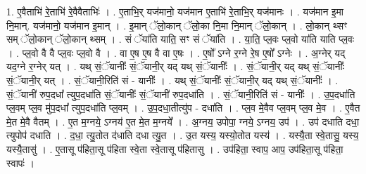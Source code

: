 \documentclass[17pt]{extarticle}
\begin{document}
1. ए॒वैताभि॑ रे॒ताभि॑ रे॒वैवैताभिः॑ । . ए॒ताभि॒र् यज॑मानो॒ यज॑मान ए॒ताभि॑ रे॒ताभि॒र् यज॑मानः । . यज॑मान इ॒मा नि॒मान्. यज॑मानो॒ यज॑मान इ॒मान् । . इ॒मान् ॅलो॒कान् ॅलो॒का नि॒मा नि॒मान् ॅलो॒कान् । . लो॒कान् थ्सꣳ सम् ॅलो॒कान् ॅलो॒कान् थ्सम् । . सं ॅया॑ति याति॒ सꣳ सं ॅया॑ति । . या॒ति॒ प्ल॒वः प्ल॒वो या॑ति याति प्ल॒वः । . प्ल॒वो वै वै प्ल॒वः प्ल॒वो वै । . वा ए॒ष ए॒ष वै वा ए॒षः । . ए॒षो᳚ ऽग्ने र॒ग्ने रे॒ष ए॒षो᳚ ऽग्नेः । . अ॒ग्नेर् यद् यद॒ग्ने र॒ग्नेर् यत् । . यथ् सं॒ॅयानीः᳚ सं॒ॅयानी॒र् यद् यथ् सं॒ॅयानीः᳚ । . सं॒ॅयानी॒र् यद् यथ् सं॒ॅयानीः᳚ सं॒ॅयानी॒र् यत् । . सं॒ॅयानी॒रिति॑ सं - यानीः᳚ । . यथ् सं॒ॅयानीः᳚ सं॒ॅयानी॒र् यद् यथ् सं॒ॅयानीः᳚ । . सं॒ॅयानी॑ रुप॒दधा᳚ त्युप॒दधा॑ति सं॒ॅयानीः᳚ सं॒ॅयानी॑ रुप॒दधा॑ति । . सं॒ॅयानी॒रिति॑ सं - यानीः᳚ । . उ॒प॒दधा॑ति प्ल॒वम् प्ल॒व मु॑प॒दधा᳚ त्युप॒दधा॑ति प्ल॒वम् । . उ॒प॒दधा॒तीत्यु॑प - दधा॑ति । . प्ल॒व मे॒वैव प्ल॒वम् प्ल॒व मे॒व । . ए॒वैत मे॒त मे॒वै वैतम् । . ए॒त म॒ग्नये॒ ऽग्नय॑ ए॒त मे॒त म॒ग्नये᳚ । . अ॒ग्नय॒ उपोपा॒ ग्नये॒ ऽग्नय॒ उप॑ । . उप॑ दधाति दधा॒ त्युपोप॑ दधाति । . द॒धा॒ त्यु॒तोत द॑धाति दधा त्यु॒त । . उ॒त यस्य॒ यस्यो॒तोत यस्य॑ । . यस्यै॒ता स्वे॒तासु॒ यस्य॒ यस्यै॒तासु॑ । . ए॒तासू प॑हिता॒सू प॑हिता स्वे॒ता स्वे॒तासू प॑हितासु । . उप॑हिता॒ स्वाप॒ आप॒ उप॑हिता॒सू प॑हिता॒ स्वापः॑ । \newline
\end{document}
